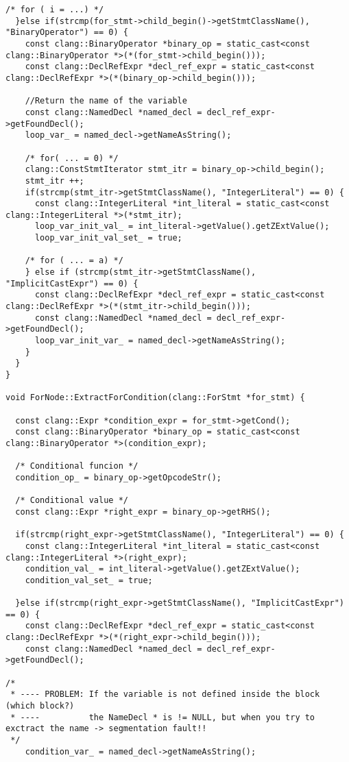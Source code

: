 \documentclass[a4paper,10pt,twoside]{book}
\begin{document}
\begin{lstlisting}[language=CCC, caption=pragma\_handler/ForNode.cpp]
  /* for ( i = ...) */
  }else if(strcmp(for_stmt->child_begin()->getStmtClassName(), "BinaryOperator") == 0) {
    const clang::BinaryOperator *binary_op = static_cast<const clang::BinaryOperator *>(*(for_stmt->child_begin())); 
    const clang::DeclRefExpr *decl_ref_expr = static_cast<const clang::DeclRefExpr *>(*(binary_op->child_begin()));
    
    //Return the name of the variable
    const clang::NamedDecl *named_decl = decl_ref_expr->getFoundDecl();
    loop_var_ = named_decl->getNameAsString();
    
    /* for( ... = 0) */
    clang::ConstStmtIterator stmt_itr = binary_op->child_begin();
    stmt_itr ++;
    if(strcmp(stmt_itr->getStmtClassName(), "IntegerLiteral") == 0) {
      const clang::IntegerLiteral *int_literal = static_cast<const clang::IntegerLiteral *>(*stmt_itr);
      loop_var_init_val_ = int_literal->getValue().getZExtValue();      
      loop_var_init_val_set_ = true;      

    /* for ( ... = a) */
    } else if (strcmp(stmt_itr->getStmtClassName(), "ImplicitCastExpr") == 0) {
      const clang::DeclRefExpr *decl_ref_expr = static_cast<const clang::DeclRefExpr *>(*(stmt_itr->child_begin()));
      const clang::NamedDecl *named_decl = decl_ref_expr->getFoundDecl();
      loop_var_init_var_ = named_decl->getNameAsString();
    }
  }
}

void ForNode::ExtractForCondition(clang::ForStmt *for_stmt) {

  const clang::Expr *condition_expr = for_stmt->getCond();
  const clang::BinaryOperator *binary_op = static_cast<const clang::BinaryOperator *>(condition_expr);
  
  /* Conditional funcion */
  condition_op_ = binary_op->getOpcodeStr();

  /* Conditional value */
  const clang::Expr *right_expr = binary_op->getRHS();

  if(strcmp(right_expr->getStmtClassName(), "IntegerLiteral") == 0) {
    const clang::IntegerLiteral *int_literal = static_cast<const clang::IntegerLiteral *>(right_expr);
    condition_val_ = int_literal->getValue().getZExtValue();
    condition_val_set_ = true;

  }else if(strcmp(right_expr->getStmtClassName(), "ImplicitCastExpr") == 0) {
    const clang::DeclRefExpr *decl_ref_expr = static_cast<const clang::DeclRefExpr *>(*(right_expr->child_begin()));
    const clang::NamedDecl *named_decl = decl_ref_expr->getFoundDecl();

/*
 * ---- PROBLEM: If the variable is not defined inside the block (which block?)
 * ----          the NameDecl * is != NULL, but when you try to exctract the name -> segmentation fault!!
 */
    condition_var_ = named_decl->getNameAsString();
  

\end{lstlisting}
\end{document}
